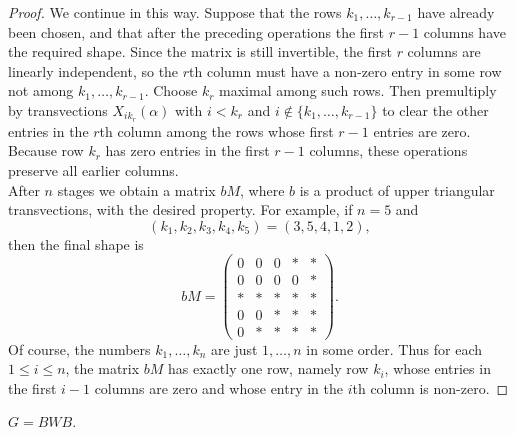 \documentclass[../Odyssey_Project.tex]{subfiles}
\begin{document}
\begin{proof}
We continue in this way. Suppose that the rows $k_1,\ldots,k_{r-1}$ have already been chosen, and that after the preceding operations the first $r-1$ columns have the required shape. Since the matrix is still invertible, the first $r$ columns are linearly independent, so the $r$th column must have a non-zero entry in some row not among $k_1,\ldots,k_{r-1}$. Choose $k_r$ maximal among such rows. Then premultiply by transvections $X_{i k_r}(\alpha)$ with $i<k_r$ and $i\notin\{k_1,\ldots,k_{r-1}\}$ to clear the other entries in the $r$th column among the rows whose first $r-1$ entries are zero. Because row $k_r$ has zero entries in the first $r-1$ columns, these operations preserve all earlier columns.\\
After $n$ stages we obtain a matrix $bM$, where $b$ is a product of upper triangular transvections, with the desired property. For example, if $n=5$ and
\[
    (k_1,k_2,k_3,k_4,k_5)=(3,5,4,1,2),
\]
then the final shape is
\[
    bM=
    \begin{pmatrix}
        0    & 0    & 0    & \ast & \ast\\
        0    & 0    & 0    & 0    & \ast\\
        \ast & \ast & \ast & \ast & \ast\\
        0    & 0    & \ast & \ast & \ast\\
        0    & \ast & \ast & \ast & \ast
    \end{pmatrix}.
\]
Of course, the numbers $k_1,\ldots,k_n$ are just $1,\ldots,n$ in some order. Thus for each $1\leq i\leq n$, the matrix $bM$ has exactly one row, namely row $k_i$, whose entries in the first $i-1$ columns are zero and whose entry in the $i$th column is non-zero.
\end{proof}

\begin{namedtheorem}
\label{thm:bruhat}
$G = BWB$.
\end{namedtheorem}
\end{document}

